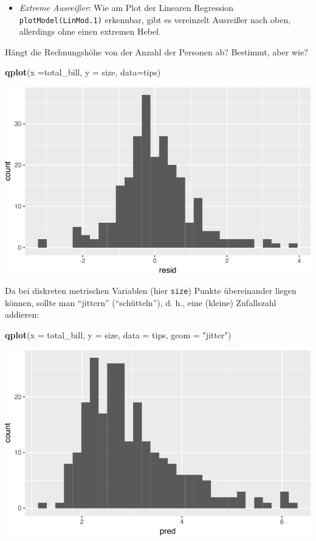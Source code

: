 \documentclass[12pt,ngerman,]{book}
\newenvironment{Shaded}{\begin{snugshade}}{\end{snugshade}}
\newcommand{\KeywordTok}[1]{\textcolor[rgb]{0.13,0.29,0.53}{\textbf{{#1}}}}
\newcommand{\DataTypeTok}[1]{\textcolor[rgb]{0.13,0.29,0.53}{{#1}}}
\newcommand{\StringTok}[1]{\textcolor[rgb]{0.31,0.60,0.02}{{#1}}}
\newcommand{\NormalTok}[1]{{#1}}
\providecommand{\tightlist}{%
  \setlength{\itemsep}{0pt}\setlength{\parskip}{0pt}}
\renewenvironment{Shaded}{\begin{kframe}}{\end{kframe}}
\begin{document}
\begin{itemize}
\tightlist
\item
  \emph{Extreme Ausreißer}: Wie am Plot der Linearen Regression
  \texttt{plotModel(LinMod.1)} erkennbar, gibt es vereinzelt Ausreißer
  nach oben, allerdings ohne einen extremen Hebel.
\end{itemize}

Hängt die Rechnungshöhe von der Anzahl der Personen ab? Bestimmt, aber
wie?

\begin{Shaded}
\begin{Highlighting}[]
\KeywordTok{qplot}\NormalTok{(}\DataTypeTok{x =}\NormalTok{total_bill, }\DataTypeTok{y =} \NormalTok{size, }\DataTypeTok{data=}\NormalTok{tips)}
\end{Highlighting}
\end{Shaded}

\begin{center}\includegraphics[width=0.7\linewidth]{071_Regression_files/figure-latex/unnamed-chunk-9-1} \end{center}

Da bei diskreten metrischen Variablen (hier \texttt{size}) Punkte
übereinander liegen können, sollte man ``jittern'' (``schütteln''), d.
h., eine (kleine) Zufallszahl addieren:

\begin{Shaded}
\begin{Highlighting}[]
\KeywordTok{qplot}\NormalTok{(}\DataTypeTok{x =} \NormalTok{total_bill, }\DataTypeTok{y =} \NormalTok{size, }\DataTypeTok{data =} \NormalTok{tips, }\DataTypeTok{geom =} \StringTok{"jitter"}\NormalTok{)}
\end{Highlighting}
\end{Shaded}

\begin{center}\includegraphics[width=0.7\linewidth]{071_Regression_files/figure-latex/unnamed-chunk-10-1} \end{center}
\end{document}

